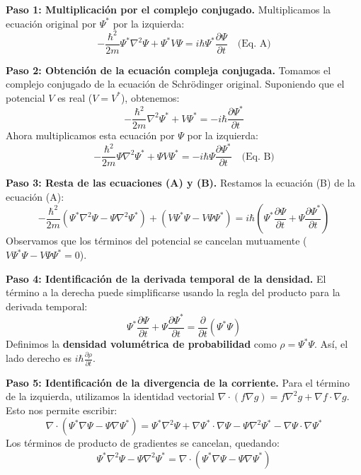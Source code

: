 \documentclass[a4paper]{article}
\begin{document}
\textbf{Paso 1: Multiplicación por el complejo conjugado.}
Multiplicamos la ecuación original por $\Psi^*$ por la izquierda:
\begin{equation}
    -\frac{\hbar^2}{2m} \Psi^* \nabla^2\Psi + \Psi^* V\Psi = i\hbar \Psi^* \frac{\partial\Psi}{\partial t} \quad \text{(Eq. A)}
\end{equation}

\textbf{Paso 2: Obtención de la ecuación compleja conjugada.}
Tomamos el complejo conjugado de la ecuación de Schrödinger original. Suponiendo que el potencial $V$ es real ($V = V^*$), obtenemos:
\begin{equation}
    -\frac{\hbar^2}{2m} \nabla^2\Psi^* + V\Psi^* = -i\hbar \frac{\partial\Psi^*}{\partial t}
\end{equation}
Ahora multiplicamos esta ecuación por $\Psi$ por la izquierda:
\begin{equation}
    -\frac{\hbar^2}{2m} \Psi \nabla^2\Psi^* + \Psi V\Psi^* = -i\hbar \Psi \frac{\partial\Psi^*}{\partial t} \quad \text{(Eq. B)}
\end{equation}

\textbf{Paso 3: Resta de las ecuaciones (A) y (B).}
Restamos la ecuación (B) de la ecuación (A):
\begin{equation}
    -\frac{\hbar^2}{2m} (\Psi^* \nabla^2\Psi - \Psi \nabla^2\Psi^*) + (V\Psi^*\Psi - V\Psi\Psi^*) = i\hbar \left( \Psi^* \frac{\partial\Psi}{\partial t} + \Psi \frac{\partial\Psi^*}{\partial t} \right)
\end{equation}
Observamos que los términos del potencial se cancelan mutuamente ($V\Psi^*\Psi - V\Psi\Psi^* = 0$).

\textbf{Paso 4: Identificación de la derivada temporal de la densidad.}
El término a la derecha puede simplificarse usando la regla del producto para la derivada temporal:
\begin{equation}
    \Psi^* \frac{\partial\Psi}{\partial t} + \Psi \frac{\partial\Psi^*}{\partial t} = \frac{\partial}{\partial t} (\Psi^* \Psi)
\end{equation}
Definimos la \textbf{densidad volumétrica de probabilidad} como $\rho = \Psi^* \Psi$. Así, el lado derecho es $i\hbar \frac{\partial\rho}{\partial t}$.

\textbf{Paso 5: Identificación de la divergencia de la corriente.}
Para el término de la izquierda, utilizamos la identidad vectorial $\nabla \cdot (f \nabla g) = f \nabla^2 g + \nabla f \cdot \nabla g$. Esto nos permite escribir:
\begin{equation}
    \nabla \cdot (\Psi^* \nabla\Psi - \Psi \nabla\Psi^*) = \Psi^* \nabla^2\Psi + \nabla\Psi^* \cdot \nabla\Psi - \Psi \nabla^2\Psi^* - \nabla\Psi \cdot \nabla\Psi^*
\end{equation}
Los términos de producto de gradientes se cancelan, quedando:
\begin{equation}
    \Psi^* \nabla^2\Psi - \Psi \nabla^2\Psi^* = \nabla \cdot (\Psi^* \nabla\Psi - \Psi \nabla\Psi^*)
\end{equation}
\end{document}

